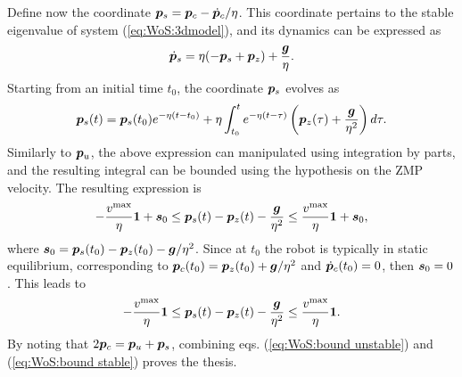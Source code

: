 Define now the coordinate ${\bm{p}}_s = {\bm{p}}_c - \dot {{\bm{p}}}_c/\eta$. This coordinate pertains to the stable eigenvalue of system (\ref{eq:WoS:3dmodel}), and its dynamics can be expressed as
\begin{equation*}
\dot{{\bm{p}}}_s = \eta(-{\bm{p}}_s + {\bm{p}}_z) + \frac{{\bm{g}}}{\eta}.
\end{equation*}
Starting from an initial time $t_0$, the coordinate ${\bm{p}}_s$ evolves as
\begin{equation*}
{\bm{p}}_s(t) = {\bm{p}}_s(t_0) e^{-\eta(t-t_0)} + \eta\int_{t_0}^t e^{-\eta(t-\tau)}\left({\bm{p}}_z(\tau)  +\frac{{\bm{g}}}{\eta^2}\right)d\tau.
\end{equation*}
Similarly to ${\bm{p}}_u$, the above expression can manipulated using integration by parts, and the resulting integral can be bounded using the hypothesis on the ZMP velocity. The resulting expression is
\begin{equation*}
-\frac{v^{\rm max}}{\eta}{\bf 1} + {\bm{s}}_0
\le
{\bm{p}}_s(t) - {\bm{p}}_z(t) - \frac{{\bm{g}}}{\eta^2}
\le
\frac{v^{\rm max}}{\eta}{\bf 1} + {\bm{s}}_0,
\end{equation*}
where ${\bm{s}}_0 = {\bm{p}}_s(t_0) - {\bm{p}}_z(t_0) - {\bm{g}}/\eta^2$. 
Since at $t_0$ the robot is typically in static equilibrium, corresponding to ${\bm{p}}_c(t_0) = {\bm{p}}_z(t_0) + {\bm{g}}/\eta^2$ and $\dot{{\bm{p}}}_c(t_0) = 0$, then ${\bm{s}}_0 = 0$. This leads to
\begin{equation}
-\frac{v^{\rm max}}{\eta}{\bf 1}\label{eq:WoS:bound stable}
\le
{\bm{p}}_s(t) - {\bm{p}}_z(t) - \frac{{\bm{g}}}{\eta^2}
\le
\frac{v^{\rm max}}{\eta}{\bf 1}.
\end{equation}
By noting that $2{\bm{p}}_c = {\bm{p}}_u + {\bm{p}}_s$, combining eqs. (\ref{eq:WoS:bound unstable}) and (\ref{eq:WoS:bound stable}) proves the thesis.
